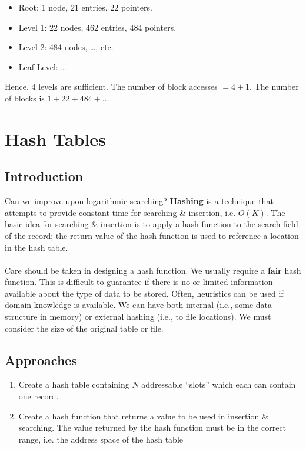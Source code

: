 \documentclass[a4paper,11pt]{article}
\begin{document}
\begin{itemize}
    \item   Root: 1 node, 21 entries, 22 pointers.
    \item   Level 1: 22 nodes, 462 entries, 484 pointers.
    \item   Level 2: 484 nodes, \dots, etc.
    \item   Leaf Level: \dots
\end{itemize}

Hence, 4 levels are sufficient. 
The number of block accesses $= 4 + 1$.
The number of blocks is $1 + 22 + 484 + \dots$

\section{Hash Tables}
\subsection{Introduction}
Can we improve upon logarithmic searching?
\textbf{Hashing} is a technique that attempts to provide constant time for searching \& insertion, i.e. $O(K)$. 
The basic idea for searching \& insertion is to apply a hash function to the search field of the record;
the return value of the hash function is used to reference a location in the hash table.
\\\\
Care should be taken in designing a hash function.
We usually require a \textbf{fair} hash function.
This is difficult to guarantee if there is no or limited information available about the type of data to be 
stored.
Often, heuristics can be used if domain knowledge is available.
We can have both internal (i.e., some data structure in memory) or external hashing (i.e., to file locations).
We must consider the size of the original table or file.

\subsection{Approaches}
\begin{enumerate}
    \item   Create a hash table containing $N$ addressable ``slots'' which each can contain one record.
    \item   Create a hash function that returns a value to be used in insertion \& searching.
            The value returned by the hash function must be in the correct range, i.e. the address space of the
            hash table
\end{enumerate}
\end{document}
